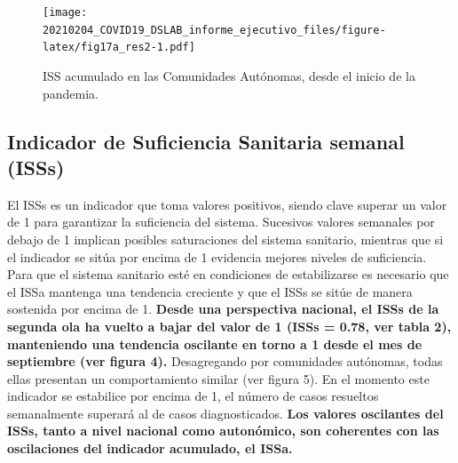 \documentclass[
  11pt,
]{article}
\begin{document}
\vspace{0.2cm}

\begin{figure}
\centering
\texttt{[image: 20210204\_COVID19\_DSLAB\_informe\_ejecutivo\_files/figure-latex/fig17a\_res2-1.pdf]}
\caption{\label{fig:fig17a_res} ISS acumulado en las Comunidades
Autónomas, desde el inicio de la pandemia.}
\end{figure}

\newpage
\setcounter{page}{6}

\hypertarget{indicador-de-suficiencia-sanitaria-semanal-isss}{%
\subsection{Indicador de Suficiencia Sanitaria semanal
(ISSs)}\label{indicador-de-suficiencia-sanitaria-semanal-isss}}

El ISSs es un indicador que toma valores positivos, siendo clave superar
un valor de 1 para garantizar la suficiencia del sistema. Sucesivos
valores semanales por debajo de 1 implican posibles saturaciones del
sistema sanitario, mientras que si el indicador se sitúa por encima de 1
evidencia mejores niveles de suficiencia. Para que el sistema sanitario
esté en condiciones de estabilizarse es necesario que el ISSa mantenga
una tendencia creciente y que el ISSs se sitúe de manera sostenida por
encima de 1. \textbf{Desde una perspectiva nacional, el ISSs de la
segunda ola ha vuelto a bajar del valor de 1 (ISSs = 0.78, ver tabla 2),
manteniendo una tendencia oscilante en torno a 1 desde el mes de
septiembre (ver figura 4).} Desagregando por comunidades autónomas,
todas ellas presentan un comportamiento similar (ver figura 5). En el
momento este indicador se estabilice por encima de 1, el número de casos
resueltos semanalmente superará al de casos diagnosticados. \textbf{Los
valores oscilantes del ISSs, tanto a nivel nacional como autonómico, son
coherentes con las oscilaciones del indicador acumulado, el ISSa.}
\end{document}
